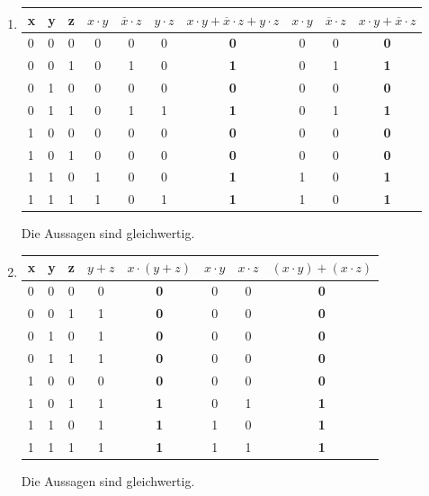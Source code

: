 \documentclass[a4paper]{article}
\begin{document}
\begin{enumerate}
\begin{enumerate}
			\item
			\begin{center}
				\begin{tabular}{|l|l|l|c|c|c|c|c|c|c|}
					\firsthline
						x & y & z & $x \cdot y$ & $\overline{x} \cdot z$ & $y \cdot z$ & $x \cdot y + \overline{x} \cdot z + y \cdot z$ & $x \cdot y$ & $\overline{x} \cdot z$ & $x \cdot y + \overline{x} \cdot z$ \\
					\hline
						0 & 0 & 0 & 0 & 0 & 0 & \textbf{0} & 0 & 0 & \textbf{0} \\
						0 & 0 & 1 & 0 & 1 & 0 & \textbf{1} & 0 & 1 & \textbf{1} \\
						0 & 1 & 0 & 0 & 0 & 0 & \textbf{0} & 0 & 0 & \textbf{0} \\
						0 & 1 & 1 & 0 & 1 & 1 & \textbf{1} & 0 & 1 & \textbf{1} \\
						1 & 0 & 0 & 0 & 0 & 0 & \textbf{0} & 0 & 0 & \textbf{0} \\
						1 & 0 & 1 & 0 & 0 & 0 & \textbf{0} & 0 & 0 & \textbf{0} \\
						1 & 1 & 0 & 1 & 0 & 0 & \textbf{1} & 1 & 0 & \textbf{1} \\
						1 & 1 & 1 & 1 & 0 & 1 & \textbf{1} & 1 & 0 & \textbf{1} \\
					\hline
				\end{tabular}
			\end{center}
			Die Aussagen sind gleichwertig.
		
			\item
			\begin{center}
				\begin{tabular}{|l|l|l|c|c|c|c|c|}
					\firsthline
						x & y & z & $y + z$ & $x \cdot (y + z)$ & $x \cdot y$ & $x \cdot z$ & $(x \cdot y) + (x \cdot z)$ \\
					\hline
						0 & 0 & 0 & 0 & \textbf{0} & 0 & 0 & \textbf{0} \\
						0 & 0 & 1 & 1 & \textbf{0} & 0 & 0 & \textbf{0} \\
						0 & 1 & 0 & 1 & \textbf{0} & 0 & 0 & \textbf{0} \\
						0 & 1 & 1 & 1 & \textbf{0} & 0 & 0 & \textbf{0} \\
						1 & 0 & 0 & 0 & \textbf{0} & 0 & 0 & \textbf{0} \\
						1 & 0 & 1 & 1 & \textbf{1} & 0 & 1 & \textbf{1} \\
						1 & 1 & 0 & 1 & \textbf{1} & 1 & 0 & \textbf{1} \\
						1 & 1 & 1 & 1 & \textbf{1} & 1 & 1 & \textbf{1} \\
					\hline
				\end{tabular}
			\end{center}
			Die Aussagen sind gleichwertig.
		\end{enumerate}
	\end{enumerate}
\end{document}
